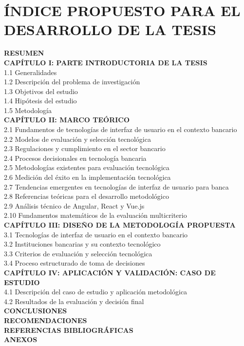 \chapter*{ÍNDICE PROPUESTO PARA EL DESARROLLO DE LA TESIS}

{\small
\noindent\textbf{RESUMEN}\\[6pt]
\noindent\textbf{CAPÍTULO I: PARTE INTRODUCTORIA DE LA TESIS}\\
1.1 Generalidades\\
1.2 Descripción del problema de investigación\\
1.3 Objetivos del estudio\\
1.4 Hipótesis del estudio\\
1.5 Metodología\\[6pt]

\noindent\textbf{CAPÍTULO II: MARCO TEÓRICO}\\
2.1 Fundamentos de tecnologías de interfaz de usuario en el contexto bancario\\
2.2 Modelos de evaluación y selección tecnológica\\
2.3 Regulaciones y cumplimiento en el sector bancario\\
2.4 Procesos decisionales en tecnología bancaria\\
2.5 Metodologías existentes para evaluación tecnológica\\
2.6 Medición del éxito en la implementación tecnológica\\
2.7 Tendencias emergentes en tecnologías de interfaz de usuario para banca\\
2.8 Referencias teóricas para el desarrollo metodológico\\
2.9 Análisis técnico de Angular, React y Vue.js\\
2.10 Fundamentos matemáticos de la evaluación multicriterio\\[6pt]

\noindent\textbf{CAPÍTULO III: DISEÑO DE LA METODOLOGÍA PROPUESTA}\\
3.1 Tecnologías de interfaz de usuario en el contexto bancario\\
3.2 Instituciones bancarias y su contexto tecnológico\\
3.3 Criterios de evaluación y selección tecnológica\\
3.4 Proceso estructurado de toma de decisiones\\[6pt]

\noindent\textbf{CAPÍTULO IV: APLICACIÓN Y VALIDACIÓN: CASO DE ESTUDIO}\\
4.1 Descripción del caso de estudio y aplicación metodológica\\
4.2 Resultados de la evaluación y decisión final\\[6pt]

\noindent\textbf{CONCLUSIONES}\\
\noindent\textbf{RECOMENDACIONES}\\
\noindent\textbf{REFERENCIAS BIBLIOGRÁFICAS}\\
\noindent\textbf{ANEXOS}
\par}
